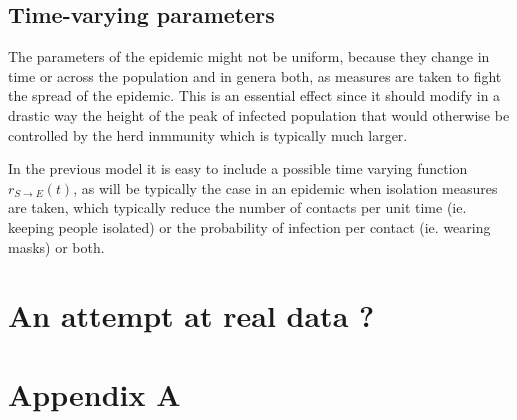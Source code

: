 \documentclass[a4paper,oneside,11pt]{article}
\begin{document}
{  %
 \subsection{Time-varying parameters}
 
 The parameters of the epidemic might not be uniform, because they change in time or across the population and in genera both, as measures are taken to 
 fight the spread of the epidemic. This is an essential effect since it should modify in a drastic way the height of the peak of infected population that would otherwise
 be controlled by the herd inmmunity which is typically much larger. 

In the previous model it is easy to include a possible time varying function $r_{S\rightarrow E}(t)$, as will be typically the case in an epidemic when isolation measures are taken, which typically reduce the number of contacts per unit time (ie. keeping people isolated) or the probability of infection per contact (ie. wearing masks) or both. 

\section{An attempt at real data ?}

\section*{Appendix A} 

}
\end{document}

